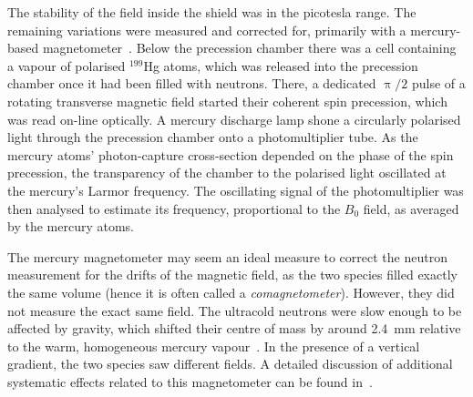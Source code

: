 The stability of the field inside the shield was in the picotesla range.
The remaining variations were measured and corrected for, primarily with a mercury-based magnetometer~\cite{FertlThesis,Komposch2017}.
Below the precession chamber there was a cell containing a vapour of polarised $^{199}$Hg atoms, which was released into the precession chamber once it had been filled with neutrons.
There, a dedicated $\uppi/2$ pulse of a rotating transverse magnetic field started their coherent spin precession, which was read on-line optically.
A mercury discharge lamp shone a circularly polarised light through the precession chamber onto a photomultiplier tube.
As the mercury atoms' photon-capture cross-section depended on the phase of the spin precession, the transparency of the chamber to the polarised light oscillated at the mercury's Larmor frequency.
The oscillating signal of the photomultiplier was then analysed to estimate its frequency, proportional to the $B_0$ field, as averaged by the mercury atoms.

The mercury magnetometer may seem an ideal measure to correct the neutron measurement for the drifts of the magnetic field, as the two species filled exactly the same volume (hence it is often called a \emph{comagnetometer}).
However, they did not measure the exact same field.
The ultracold neutrons were slow enough to be affected by gravity, which shifted their centre of mass by around \SI{2.4}{\milli\meter} relative to the warm, homogeneous mercury vapour~\cite{Afach2014magmoment}.
In the presence of a vertical gradient, the two species saw different fields.
A detailed discussion of additional systematic effects related to this magnetometer can be found in~\cite{Afach2014magmoment}.

